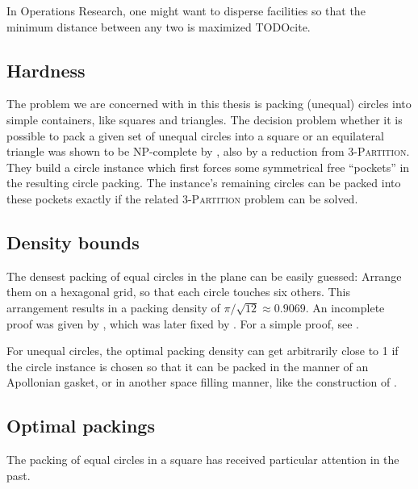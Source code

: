 \documentclass[a4paper,style=print,bibliography=totoc,nexus,lnum,extramargin]{tubsbook}
\begin{document}
In Operations Research, one might want to disperse facilities so that the minimum distance between any two is maximized TODOcite.


\subsection{Hardness}

The problem we are concerned with in this thesis is packing (unequal) circles into simple containers, like squares and triangles. The decision problem whether it is possible to pack a given set of unequal circles into a square or an equilateral triangle was shown to be NP-complete by \textcite{DFL2010circle}, also by a reduction from \textsc{3-Partition}. They build a circle instance which first forces some symmetrical free “pockets” in the resulting circle packing. The instance's remaining circles can be packed into these pockets exactly if the related \textsc{3-Partition} problem can be solved.

\subsection{Density bounds}

The densest packing of equal circles in the plane can be easily guessed: Arrange them on a hexagonal grid, so that each circle touches six others. This arrangement results in a packing density of $\pi/\sqrt{12} \approx 0.9069$. An incomplete proof was given by \textcite{thue1892om}, which was later fixed by \textcite{fejestoth1940uber}. For a simple proof, see \cite{CW2010simple}.

For unequal circles, the optimal packing density can get arbitrarily close to 1 if the circle instance is chosen so that it can be packed in the manner of an Apollonian gasket, or in another space filling manner, like the construction of \textcite{bourke2011random}.

\subsection{Optimal packings}

The packing of equal circles in a square has received particular attention in the past.
\end{document}
